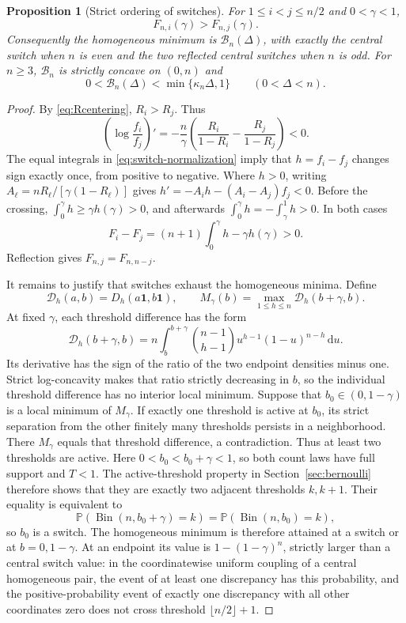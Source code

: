 \documentclass[11pt]{article}
\numberwithin{equation}{section}
\newtheorem{proposition}[theorem]{Proposition}
\theoremstyle{remark}\newtheorem{remark}[theorem]{Remark}
\DeclareMathOperator{\Bin}{Bin}
\newcommand{\PP}{\mathbb P}
\newcommand{\one}{\mathbf 1}
\newcommand{\dd}{\,\mathrm d}
\newcommand{\Bcal}{\mathcal B}
\newcommand{\Dcal}{\mathcal D}
\begin{document}
\begin{proposition}[Strict ordering of switches]\label{prop:switch-order}
For $1\le i<j\le n/2$ and $0<\gamma<1$,
\[
 F_{n,i}(\gamma)>F_{n,j}(\gamma).
\]
Consequently the homogeneous minimum is $\Bcal_n(\Delta)$, with exactly
the central switch when $n$ is even and the two reflected central
switches when $n$ is odd.
For $n\ge3$, $\Bcal_n$ is strictly concave on $(0,n)$ and
\begin{equation}\label{eq:strict-linear}
 0<\Bcal_n(\Delta)<\min\{\kappa_n\Delta,1\}
 \qquad(0<\Delta<n).
\end{equation}
\end{proposition}
\begin{proof}
By \eqref{eq:Rcentering}, $R_i>R_j$. Thus
\[
 \left(\log\frac{f_i}{f_j}\right)'
 =-\frac n\gamma\left(\frac{R_i}{1-R_i}-\frac{R_j}{1-R_j}\right)<0.
\]
The equal integrals in \eqref{eq:switch-normalization} imply that
$h=f_i-f_j$ changes sign exactly once, from positive to negative.
Where $h>0$, writing $A_\ell=nR_\ell/[\gamma(1-R_\ell)]$ gives
$h'=-A_i h-(A_i-A_j)f_j<0$. Before the crossing,
$\int_0^\gamma h\ge\gamma h(\gamma)>0$, and afterwards
$\int_0^\gamma h=-\int_\gamma^1h>0$. In both cases
\[
 F_i-F_j=(n+1)\int_0^\gamma h-\gamma h(\gamma)>0.
\]
Reflection gives $F_{n,j}=F_{n,n-j}$.

It remains to justify that switches exhaust the homogeneous minima.
Define
\[
 \Dcal_h(a,b)=D_h(a\one,b\one),\qquad
 M_\gamma(b)=\max_{1\le h\le n}\Dcal_h(b+\gamma,b).
\]
At fixed $\gamma$, each threshold difference has the form
\[
 \Dcal_h(b+\gamma,b)=n\int_b^{b+\gamma}
 \binom{n-1}{h-1}u^{h-1}(1-u)^{n-h}\dd u.
\]
Its derivative has the sign of the ratio of the two endpoint densities
minus one. Strict log-concavity makes that ratio strictly decreasing in
$b$, so the individual threshold difference has no interior local minimum.
Suppose that $b_0\in(0,1-\gamma)$ is a local minimum of $M_\gamma$.
If exactly one threshold is active at $b_0$, its strict separation from
the other finitely many thresholds persists in a neighborhood. There
$M_\gamma$ equals that threshold difference, a contradiction. Thus at
least two thresholds are active. Here $0<b_0<b_0+\gamma<1$, so both
count laws have full support and $T<1$. The active-threshold property in
Section~\ref{sec:bernoulli} therefore shows that they are exactly two
adjacent thresholds
$k,k+1$. Their equality is equivalent to
\[
 \PP(\Bin(n,b_0+\gamma)=k)=\PP(\Bin(n,b_0)=k),
\]
so $b_0$ is a switch. The homogeneous minimum is therefore attained at
a switch or at $b=0,1-\gamma$.
At an endpoint its value is $1-(1-\gamma)^n$, strictly larger than a
central switch value: in the coordinatewise uniform coupling of a
central homogeneous pair, the event of at least one discrepancy has
this probability, and the positive-probability event of exactly one
discrepancy with all other coordinates zero does not cross threshold
$\lfloor n/2\rfloor+1$.


\end{proof}
\end{document}
